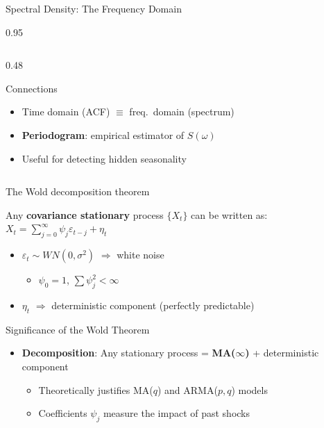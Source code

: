 \documentclass[9pt, aspectratio=169, t]{beamer}
\begin{document}
\begin{frame}{Spectral Density: The Frequency Domain}
\begin{cminipage}{0.95\textwidth}
\begin{columns}[T]
\begin{column}{0.48\textwidth}
\begin{exampleblock}{Connections}
\begin{itemize}
                        \item Time domain (ACF) $\equiv$ freq.\ domain (spectrum)
                        \item \textbf{Periodogram}: empirical estimator of $S(\omega)$
                        \item Useful for detecting hidden seasonality
                    \end{itemize}
                \end{exampleblock}
            \end{column}
        \end{columns}
    \end{cminipage}
\end{frame}

\begin{frame}{The Wold decomposition theorem}
    \small
    \begin{thm}[Wold, 1938]
        Any \textbf{covariance stationary} process $\{X_t\}$ can be written as:
        $X_t = \sum_{j=0}^{\infty} \psi_j \varepsilon_{t-j} + \eta_t$
        \begin{itemize}
            \item $\varepsilon_t \sim WN(0, \sigma^2)$ $\Rightarrow$ white noise
            \begin{itemize}
                \item $\psi_0 = 1$, $\sum \psi_j^2 < \infty$
            \end{itemize}
            \item $\eta_t$ $\Rightarrow$ deterministic component (perfectly predictable)
        \end{itemize}
    \end{thm}

    \begin{exampleblock}{Significance of the Wold Theorem}
        \begin{itemize}\setlength{\itemsep}{0pt}
            \item \textbf{Decomposition}: Any stationary process = \textbf{MA($\infty$)} + deterministic component
            \begin{itemize}
                \item Theoretically justifies MA($q$) and ARMA($p,q$) models
                \item Coefficients $\psi_j$ measure the impact of past shocks
            \end{itemize}
        \end{itemize}
    \end{exampleblock}
\end{frame}
\end{document}
